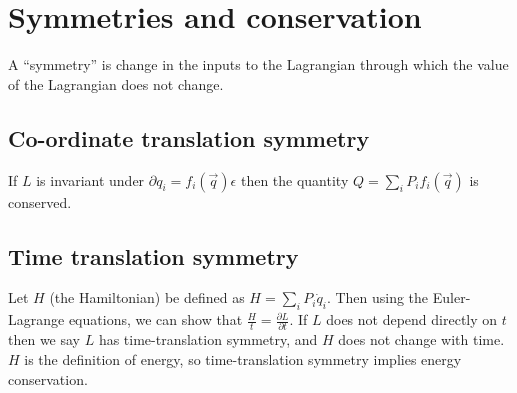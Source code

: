 \documentclass[12pt]{article}
\begin{document}
\section{Symmetries and conservation}

A ``symmetry'' is change in the inputs to the Lagrangian through which the value
of the Lagrangian does not change.

\subsection{Co-ordinate translation symmetry}

If $L$ is invariant under $\partial q_i = f_i(\overrightarrow{q}) \epsilon$ then
the quantity $Q = \sum_{i} P_{i} f_i(\overrightarrow{q})$ is conserved.

\subsection{Time translation symmetry}

Let $H$ (the Hamiltonian) be defined as $H = \sum_i P_i \dot{q}_i$.  Then using
the Euler-Lagrange equations, we can show that $\frac{H}{t} = \frac{\partial
  L}{\partial t}$.  If $L$ does not depend directly on $t$ then we say $L$ has
time-translation symmetry, and $H$ does not change with time.  $H$ is the
definition of energy, so time-translation symmetry implies energy conservation.
\end{document}
